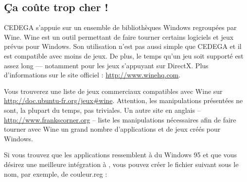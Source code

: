 \subsection{Ça coûte trop cher !}
CEDEGA s'appuie sur un ensemble de bibliothèques Windows regroupées par Wine. Wine est un outil  permettant de faire tourner certains logiciels et jeux prévus pour Windows. Son utilisation n'est pas aussi simple que CEDEGA et il est compatible avec moins de jeux. De plus, le temps qu'un jeu soit supporté est assez long --- notamment pour les jeux s'appuyant sur DirectX. Plus d'informations sur le site officiel : \url{http://www.winehq.com}.\par
{}
\begin{nota}
Vous trouverez une liste de jeux commerciaux compatibles avec Wine sur \url{http://doc.ubuntu-fr.org/jeux#wine}. Attention, les manipulations présentées ne sont, la plupart du temps, pas triviales. Un autre site en anglais -- \url{http://www.frankscorner.org} -- liste les manipulations nécessaires afin de faire tourner avec Wine un grand nombre d'applications et de jeux créés pour Windows.
\end{nota}
Si vous trouvez que les applications ressemblent à du Windows 95 et que vous désirez une meilleure intégration à , vous pouvez créer le fichier  suivant sous le nom, par exemple, de couleur.reg :\\

